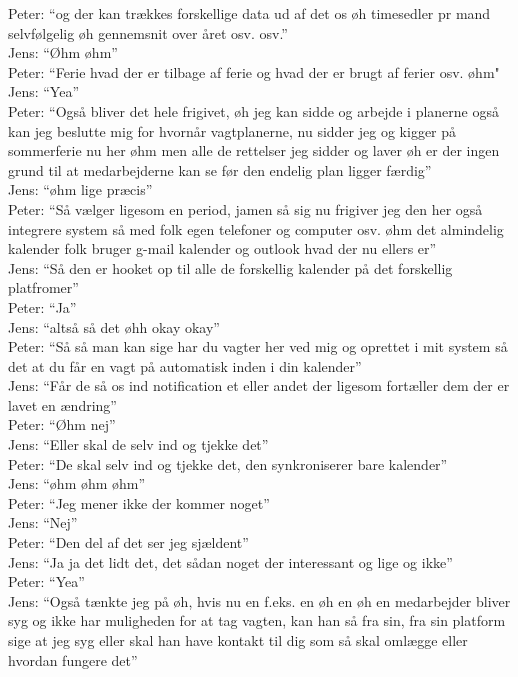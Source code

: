 Peter: “og der kan trækkes forskellige data ud af det os øh timesedler pr mand selvfølgelig øh gennemsnit over året osv. osv.”\\
Jens: “Øhm øhm”\\
Peter: “Ferie hvad der er tilbage af ferie og hvad der er brugt af ferier osv. øhm"\\
Jens: “Yea”\\
Peter: “Også bliver det hele frigivet, øh jeg kan sidde og arbejde i planerne også kan jeg beslutte mig for hvornår vagtplanerne, nu sidder jeg og kigger på sommerferie nu her øhm men alle de rettelser jeg sidder og laver øh er der ingen grund til at medarbejderne kan se før den endelig plan ligger færdig”\\
Jens: “øhm lige præcis”\\
Peter: “Så vælger ligesom en period, jamen så sig nu frigiver jeg den her også integrere system så med folk egen telefoner og computer osv. øhm det almindelig kalender folk bruger g-mail kalender og outlook hvad der nu ellers er”\\
Jens: “Så den er hooket op til alle de forskellig kalender på det forskellig platfromer”\\
Peter: “Ja”\\
Jens: “altså så det øhh okay okay”\\
Peter: “Så så man kan sige har du vagter her ved mig og oprettet i mit system så det at du får en vagt på automatisk inden i din kalender”\\
Jens: “Får de så os ind notification et eller andet der ligesom fortæller dem der er lavet en ændring”\\
Peter: “Øhm nej”\\
Jens: “Eller skal de selv ind og tjekke det”\\
Peter: “De skal selv ind og tjekke det, den synkroniserer bare kalender”\\
Jens: “øhm øhm øhm”\\
Peter: “Jeg mener ikke der kommer noget” \\
Jens: “Nej”\\
Peter: “Den del af det ser jeg sjældent”\\
Jens: “Ja ja det lidt det, det sådan noget der interessant og lige og ikke”\\
Peter: “Yea”\\
Jens: “Også tænkte jeg på øh, hvis nu en f.eks. en øh en øh en medarbejder bliver syg og ikke har muligheden for at tag vagten, kan han så fra sin, fra sin platform sige at jeg syg eller skal han have kontakt til dig som så skal omlægge eller hvordan fungere det”\\

